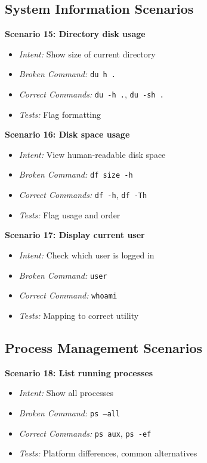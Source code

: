 \subsection{System Information Scenarios}

\textbf{Scenario 15: Directory disk usage}
\begin{itemize}
	\item \textit{Intent:} Show size of current directory
	\item \textit{Broken Command:} \texttt{du h .}
	\item \textit{Correct Commands:} \texttt{du -h .}, \texttt{du -sh .}
	\item \textit{Tests:} Flag formatting
\end{itemize}

\textbf{Scenario 16: Disk space usage}
\begin{itemize}
	\item \textit{Intent:} View human-readable disk space
	\item \textit{Broken Command:} \texttt{df size -h}
	\item \textit{Correct Commands:} \texttt{df -h}, \texttt{df -Th}
	\item \textit{Tests:} Flag usage and order
\end{itemize}

\textbf{Scenario 17: Display current user}
\begin{itemize}
	\item \textit{Intent:} Check which user is logged in
	\item \textit{Broken Command:} \texttt{user}
	\item \textit{Correct Command:} \texttt{whoami}
	\item \textit{Tests:} Mapping to correct utility
\end{itemize}

\subsection{Process Management Scenarios}

\textbf{Scenario 18: List running processes}
\begin{itemize}
	\item \textit{Intent:} Show all processes
	\item \textit{Broken Command:} \texttt{ps --all}
	\item \textit{Correct Commands:} \texttt{ps aux}, \texttt{ps -ef}
	\item \textit{Tests:} Platform differences, common alternatives
\end{itemize}

